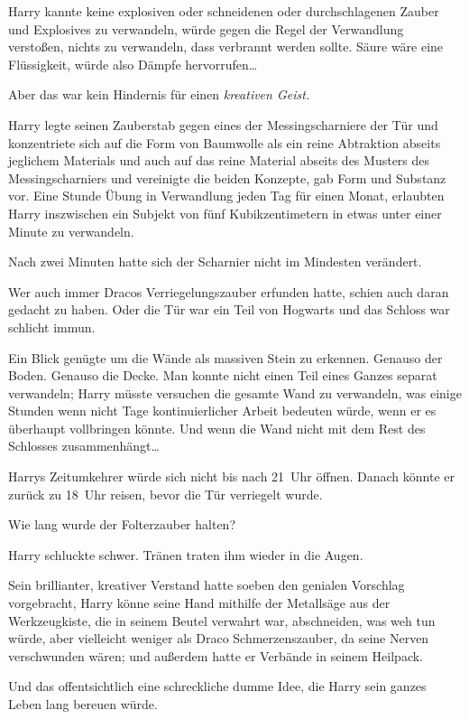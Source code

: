 {Harry kannte keine explosiven oder schneidenen oder durchschlagenen Zauber und Explosives zu verwandeln, würde gegen die Regel der Verwandlung verstoßen, nichts zu verwandeln, dass verbrannt werden sollte. Säure wäre eine Flüssigkeit, würde also Dämpfe hervorrufen…

Aber das war kein Hindernis für einen \emph{kreativen Geist.}

Harry legte seinen Zauberstab gegen eines der Messingscharniere der Tür und konzentriete sich auf die Form von Baumwolle als ein reine Abtraktion abseits jeglichem Materials und auch auf das reine Material abseits des Musters des Messingscharniers und vereinigte die beiden Konzepte, gab Form und Substanz vor. Eine Stunde Übung in Verwandlung jeden Tag für einen Monat, erlaubten Harry inszwischen ein Subjekt von fünf Kubikzentimetern in etwas unter einer Minute zu verwandeln.

Nach zwei Minuten hatte sich der Scharnier nicht im Mindesten verändert.

Wer auch immer Dracos Verriegelungszauber erfunden hatte, schien auch daran gedacht zu haben. Oder die Tür war ein Teil von Hogwarts und das Schloss war schlicht immun.

Ein Blick genügte um die Wände als massiven Stein zu erkennen. Genauso der Boden. Genauso die Decke. Man konnte nicht einen Teil eines Ganzes separat verwandeln; Harry müsste versuchen die gesamte Wand zu verwandeln, was einige Stunden wenn nicht Tage kontinuierlicher Arbeit bedeuten würde, wenn er es überhaupt vollbringen könnte. Und wenn die Wand nicht mit dem Rest des Schlosses zusammenhängt…

Harrys Zeitumkehrer würde sich nicht bis nach 21~Uhr öffnen. Danach könnte er zurück zu 18~Uhr reisen, bevor die Tür verriegelt wurde.

Wie lang wurde der Folterzauber halten?

Harry schluckte schwer. Tränen traten ihm wieder in die Augen.

Sein brillianter, kreativer Verstand hatte soeben den genialen Vorschlag vorgebracht, Harry könne seine Hand mithilfe der Metallsäge aus der Werkzeugkiste, die in seinem Beutel verwahrt war, abschneiden, was weh tun würde, aber vielleicht weniger als Draco Schmerzenszauber, da seine Nerven verschwunden wären; und außerdem hatte er Verbände in seinem Heilpack.

Und das offentsichtlich eine schreckliche dumme Idee, die Harry sein ganzes Leben lang bereuen würde.

}
